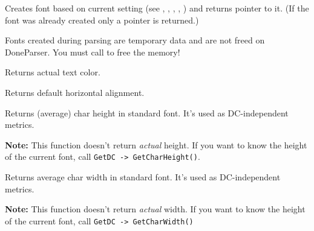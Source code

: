 \label{wxhtmlwinparsercreatecurrentfont}


Creates font based on current setting (see 
,
,
,
,
)
and returns pointer to it.
(If the font was already created only a pointer is returned.)

Fonts created during parsing are temporary data and are not freed on DoneParser. 
You must call 
to free the memory!

\label{wxhtmlwinparsergetactualcolor}


Returns actual text color.

\label{wxhtmlwinparsergetalign}


Returns default horizontal alignment.

\label{wxhtmlwinparsergetcharheight}


Returns (average) char height in standard font. It's used as DC-independent metrics.

{\bf Note:} This function doesn't return {\it actual} height. If you want to
know the height of the current font, call {\tt GetDC -> GetCharHeight()}.

\label{wxhtmlwinparsergetcharwidth}


Returns average char width in standard font. It's used as DC-independent metrics.

{\bf Note:} This function doesn't return {\it actual} width. If you want to
know the height of the current font, call {\tt GetDC -> GetCharWidth()}

\label{wxhtmlwinparsergetcontainer}

